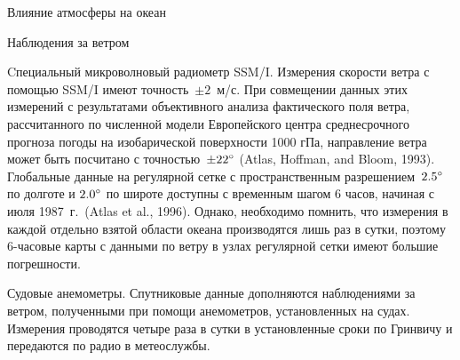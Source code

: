 \begin{chapter}{Влияние атмосферы на океан}
\begin{section}{Наблюдения за ветром}
\begin{paragraph}{Cпециальный микроволновый радиометр SSM/I.}
Измерения скорости ветра с помощью SSM/I имеют точность~$\pm 2$~м/с. При
совмещении данных этих измерений с результатами объективного анализа
фактического поля ветра, рассчитанного по численной модели
Европейского центра среднесрочного прогноза погоды на изобарической
поверхности 1000 гПа, направление ветра может быть посчитано с
точностью~$\pm {22}^\circ$ (Atlas, Hoffman, and Bloom, 1993). 
Глобальные данные на регулярной сетке с пространственным 
разрешением~${2.5}^\circ$ по долготе и ${2.0}^\circ$ по широте 
доступны с временным шагом 6 часов, начиная с июля 1987~г.\  (Atlas et al., 1996). 
Однако, необходимо помнить, что измерения в каждой отдельно взятой области 
океана производятся лишь раз в сутки, поэтому 6-часовые карты с данными 
по ветру в узлах регулярной сетки имеют большие погрешности.
%
\end{paragraph}

\begin{paragraph}{Судовые анемометры.}
Спутниковые данные дополняются наблюдениями за ветром, полученными при помощи
анемометров, установленных на судах. Измерения проводятся четыре раза
в сутки в установленные сроки по Гринвичу и передаются по радио в
метеослужбы.
%


\end{paragraph}
\end{section}
\end{chapter}
